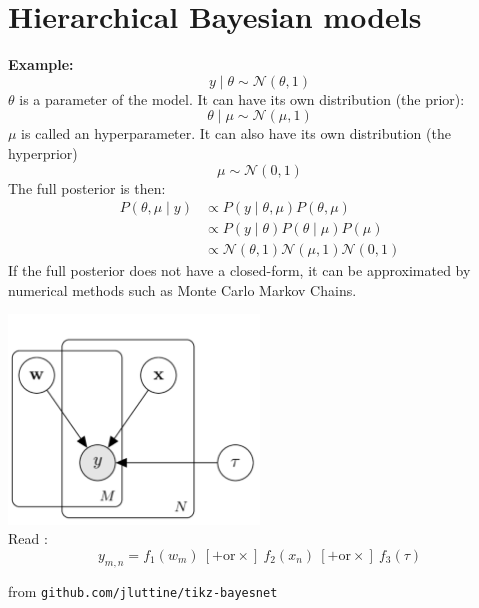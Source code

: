 \documentclass[10pt,xcolor=x11names,compress, show notes]{beamer}%
\newcommand{\N}{\mathcal{N}}
\begin{document}
\section{Hierarchical Bayesian models}
\begin{frame}{\insertsectionhead}
\textbf{Example:}\\
$$y\mid \theta \sim \N(\theta, 1)$$
\pause
$\theta$ is a parameter of the model. It can have its own distribution (the prior):
$$\theta \mid \mu \sim \N(\mu,1)$$
\pause
$\mu$ is called an hyperparameter. It can also have its own distribution (the hyperprior)
$$\mu \sim \N(0,1)$$
\pause
The full posterior is then:
\begin{align*}
	P(\theta,\mu \mid y) &\propto P(y \mid \theta,\mu)P(\theta,\mu)\\
	& \propto P(y \mid \theta)P(\theta \mid \mu) P(\mu)\\
	&\propto \N(\theta, 1)\N(\mu,1) \N(0,1)
\end{align*}
\pause
If the full posterior does not have a closed-form, it can be approximated by numerical methods such as Monte Carlo Markov Chains. 
\end{frame}
\begin{frame}{\insertsectionhead}
\centering
\includegraphics[width=0.5\textwidth]{bayesnet1.png}\\
Read : 
\begin{equation*}
	     y_{m,n} = f_1(w_m) ~ [ + \text{or} \times ]~ f_2(x_n)~ [ + \text{or} \times ]~ f_3(\tau)
\end{equation*}


\vfill
\scriptsize from \texttt{github.com/jluttine/tikz-bayesnet}
\end{frame}
\end{document}
